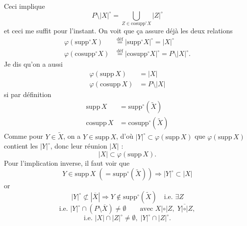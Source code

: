 \documentclass[11pt,a4paper]{article}
\begin{document}
 Ceci implique
\[
P \setminus |X|^\circ = \bigcup_{Z\in\mathrm{cosupp}^\circ X} |Z|^\circ
\]
et ceci me suffit pour l'instant. On voit que ça assure déjà les deux relations
\[
\begin{aligned}
\varphi(\mathrm{supp}^\circ X) &\overset{\text{déf}}{=} |\mathrm{supp}^\circ X|^\circ = |X|^\circ\\
\varphi(\mathrm{cosupp}^\circ X) &\overset{\text{déf}}{=} |\mathrm{cosupp}^\circ X|^\circ = P\setminus |X|^\circ .
\end{aligned}
\]
 Je dis qu'on a aussi 
\[
\begin{aligned}
\varphi(\mathrm{supp}\,X) &= |X|\\
\varphi(\mathrm{cosupp}\,X) &= P\setminus |X|
\end{aligned}
\]
si \struck{\ill{}} par définition
\[
\begin{aligned}
\mathrm{supp}\,X &= \mathrm{supp}^\circ(\widetilde{X})\\
\mathrm{cosupp}\,X &= \mathrm{cosupp}^\circ(\widetilde{X})
\end{aligned}
\]
Comme pour $Y\in\widetilde{X}$, on a $Y\in\mathrm{supp}\,X$, d'où  $|Y|^\circ \subset \varphi(\mathrm{supp}\,X)$  que $\varphi(\mathrm{supp}\,X)$ contient les $|Y|^\circ$, donc leur réunion $|X|$ :
\[
|X| \subset \varphi(\mathrm{supp}\,X) .
\]
Pour l'implication inverse, il faut voir que
\[
Y \in \mathrm{supp}\,X \;(= \mathrm{supp}^\circ(\widetilde{X})) \Longrightarrow |Y|^\circ \subset |X|
\]
or 
\[
|Y|^\circ \not\subset |\overline{X}| \Longrightarrow Y \notin \mathrm{supp}^\circ(\widetilde{X}) \quad \text{i.e. } \exists Z
\]
\[
\text{i.e. } |Y|^\circ \cap (P \setminus \overline{X}) \neq \emptyset
\qquad
\text{avec } X \mathrel{|{\circ}|} Z,\; Y \mathrel{\overline{|\circ|}} Z ,
\]
\[
\text{i.e. } |X| \cap |Z|^\circ \neq \emptyset,\; |Y|^\circ \cap |Z|^\circ .
\]

\end{document}
